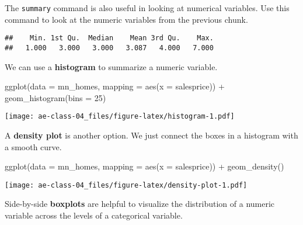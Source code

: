 \documentclass[
]{article}
\newenvironment{Shaded}{\begin{snugshade}}{\end{snugshade}}
\newcommand{\AttributeTok}[1]{\textcolor[rgb]{0.77,0.63,0.00}{#1}}
\newcommand{\DecValTok}[1]{\textcolor[rgb]{0.00,0.00,0.81}{#1}}
\newcommand{\FunctionTok}[1]{\textcolor[rgb]{0.00,0.00,0.00}{#1}}
\newcommand{\NormalTok}[1]{#1}
\newcommand{\SpecialCharTok}[1]{\textcolor[rgb]{0.00,0.00,0.00}{#1}}
\begin{document}
The \texttt{summary} command is also useful in looking at numerical
variables. Use this command to look at the numeric variables from the
previous chunk.

\begin{Shaded}
\end{Shaded}

\begin{verbatim}
##    Min. 1st Qu.  Median    Mean 3rd Qu.    Max. 
##   1.000   3.000   3.000   3.087   4.000   7.000
\end{verbatim}

We can use a \textbf{histogram} to summarize a numeric variable.

\begin{Shaded}
\begin{Highlighting}[]
\FunctionTok{ggplot}\NormalTok{(}\AttributeTok{data =}\NormalTok{ mn\_homes, }
       \AttributeTok{mapping =} \FunctionTok{aes}\NormalTok{(}\AttributeTok{x =}\NormalTok{ salesprice)) }\SpecialCharTok{+} 
   \FunctionTok{geom\_histogram}\NormalTok{(}\AttributeTok{bins =} \DecValTok{25}\NormalTok{)}
\end{Highlighting}
\end{Shaded}

\texttt{[image: ae-class-04\_files/figure-latex/histogram-1.pdf]}

A \textbf{density plot} is another option. We just connect the boxes in
a histogram with a smooth curve.

\begin{Shaded}
\begin{Highlighting}[]
\FunctionTok{ggplot}\NormalTok{(}\AttributeTok{data =}\NormalTok{ mn\_homes, }
       \AttributeTok{mapping =} \FunctionTok{aes}\NormalTok{(}\AttributeTok{x =}\NormalTok{ salesprice)) }\SpecialCharTok{+} 
   \FunctionTok{geom\_density}\NormalTok{()}
\end{Highlighting}
\end{Shaded}

\texttt{[image: ae-class-04\_files/figure-latex/density-plot-1.pdf]}

Side-by-side \textbf{boxplots} are helpful to visualize the distribution
of a numeric variable across the levels of a categorical variable.
\end{document}
